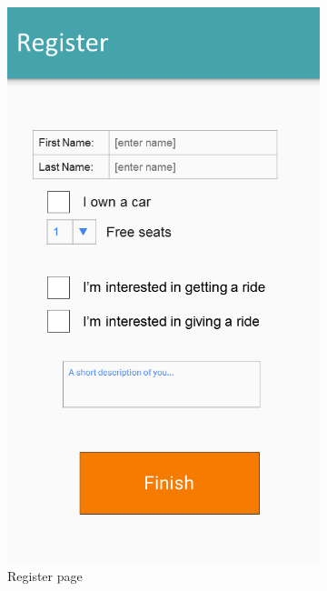 \begin{figure}[h!]
\begin{subfigure}[b]{0.3\textwidth}
	 	\includegraphics[width=\textwidth]{figures/GUI-register.png}
	 	\caption{Register page}
	 	\label{fig:GUI-register}
	 \end{subfigure}
	 ~ %
	 \begin{subfigure}[b]{0.3\textwidth}

\end{subfigure}
\end{figure}
